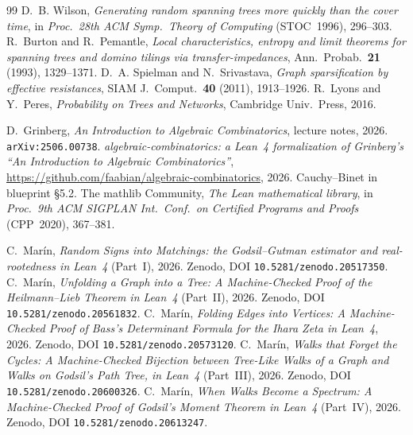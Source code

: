 \documentclass[11pt]{article}
\begin{document}
\begin{thebibliography}{99}
 D.~B. Wilson, \emph{Generating random spanning trees more quickly than the
cover time}, in \emph{Proc.\ 28th ACM Symp.\ Theory of Computing} (STOC~1996), 296--303.
 R.~Burton and R.~Pemantle, \emph{Local characteristics, entropy
and limit theorems for spanning trees and domino tilings via transfer-impedances}, Ann.\
Probab.\ \textbf{21} (1993), 1329--1371.
 D.~A. Spielman and N.~Srivastava, \emph{Graph sparsification
by effective resistances}, SIAM J.~Comput.\ \textbf{40} (2011), 1913--1926.
\bibitem{LyonsPeres} R.~Lyons and Y.~Peres, \emph{Probability on Trees and Networks}, Cambridge
Univ.\ Press, 2016.

 D.~Grinberg, \emph{An Introduction to Algebraic Combinatorics}, lecture
notes, 2026. \texttt{arXiv:2506.00738}.
 \emph{algebraic-combinatorics: a Lean~4 formalization of Grinberg's ``An
Introduction to Algebraic Combinatorics''},
\url{https://github.com/faabian/algebraic-combinatorics}, 2026. Cauchy--Binet in blueprint
\S5.2.
 The mathlib Community, \emph{The Lean mathematical library}, in \emph{Proc.\
9th ACM SIGPLAN Int.\ Conf.\ on Certified Programs and Proofs} (CPP~2020), 367--381.

 C.~Mar\'in, \emph{Random Signs into Matchings: the Godsil--Gutman estimator and
real-rootedness in Lean~4} (Part~I), 2026. Zenodo, DOI \texttt{10.5281/zenodo.20517350}.
\bibitem{PartII} C.~Mar\'in, \emph{Unfolding a Graph into a Tree: A Machine-Checked Proof of
the Heilmann--Lieb Theorem in Lean~4} (Part~II), 2026. Zenodo, DOI
\texttt{10.5281/zenodo.20561832}.
\bibitem{Bass} C.~Mar\'in, \emph{Folding Edges into Vertices: A Machine-Checked Proof of Bass's
Determinant Formula for the Ihara Zeta in Lean~4}, 2026. Zenodo, DOI
\texttt{10.5281/zenodo.20573120}.
\bibitem{PartIII} C.~Mar\'in, \emph{Walks that Forget the Cycles: A Machine-Checked Bijection
between Tree-Like Walks of a Graph and Walks on Godsil's Path Tree, in Lean~4} (Part~III),
2026. Zenodo, DOI \texttt{10.5281/zenodo.20600326}.
\bibitem{PartIV} C.~Mar\'in, \emph{When Walks Become a Spectrum: A Machine-Checked Proof of
Godsil's Moment Theorem in Lean~4} (Part~IV), 2026. Zenodo, DOI
\texttt{10.5281/zenodo.20613247}.

\end{thebibliography}
\end{document}
